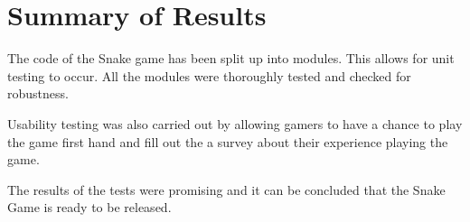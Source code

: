 \documentclass[12pt]{article}
\begin{document}
\section{Summary of Results}
The code of the Snake game has been split up into modules. This allows for unit testing to occur. All the modules were thoroughly tested and checked for robustness.

Usability testing was also carried out by allowing gamers to have a chance to play the game first hand and fill out the a survey about their experience playing the game.

The results of the tests were promising and it can be concluded that the Snake Game is ready to be released.
\end{document}
